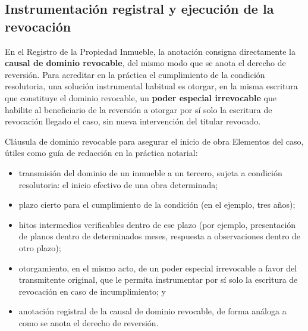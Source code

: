 \documentclass[12pt,oneside]{book}
\begin{document}
\subsection{Instrumentación registral y ejecución de la revocación}

En el Registro de la Propiedad Inmueble, la anotación consigna directamente la \textbf{causal de dominio revocable}, del mismo modo que se anota el derecho de reversión. Para acreditar en la práctica el cumplimiento de la condición resolutoria, una solución instrumental habitual es otorgar, en la misma escritura que constituye el dominio revocable, un \textbf{poder especial irrevocable} que habilite al beneficiario de la reversión a otorgar por sí solo la escritura de revocación llegado el caso, sin nueva intervención del titular revocado.

\begin{example}{Cláusula de dominio revocable para asegurar el inicio de obra}
Elementos del caso, útiles como guía de redacción en la práctica notarial:
\begin{itemize}
    \item transmisión del dominio de un inmueble a un tercero, sujeta a condición resolutoria: el inicio efectivo de una obra determinada;
    \item plazo cierto para el cumplimiento de la condición (en el ejemplo, tres años);
    \item hitos intermedios verificables dentro de ese plazo (por ejemplo, presentación de planos dentro de determinados meses, respuesta a observaciones dentro de otro plazo);
    \item otorgamiento, en el mismo acto, de un poder especial irrevocable a favor del transmitente original, que le permita instrumentar por sí solo la escritura de revocación en caso de incumplimiento; y
    \item anotación registral de la causal de dominio revocable, de forma análoga a como se anota el derecho de reversión.
\end{itemize}
\end{example}
\end{document}
